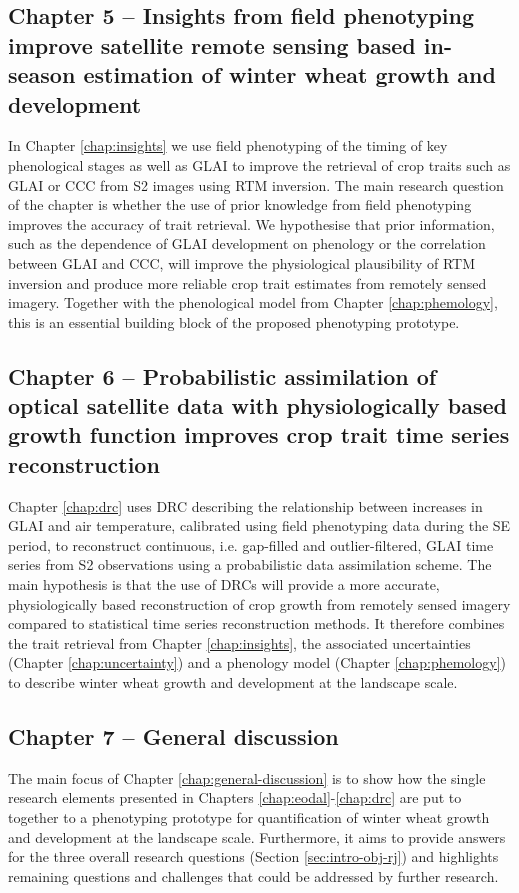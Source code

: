 \subsection*{Chapter 5 -- Insights from field phenotyping improve satellite remote sensing based in-season estimation of winter wheat growth and development}
In Chapter \ref{chap:insights} we use field phenotyping of the timing of key phenological stages as well as \gls{GLAI} to improve the retrieval of crop traits such as \gls{GLAI} or \gls{CCC} from \gls{S2} images using \gls{RTM} inversion. The main research question of the chapter is whether the use of prior knowledge from field phenotyping improves the accuracy of trait retrieval. We hypothesise that prior information, such as the dependence of \gls{GLAI} development on phenology or the correlation between \gls{GLAI} and \gls{CCC}, will improve the physiological plausibility of \gls{RTM} inversion and produce more reliable crop trait estimates from remotely sensed imagery. Together with the phenological model from Chapter \ref{chap:phemology}, this is an essential building block of the proposed phenotyping prototype.

\subsection*{Chapter 6 -- Probabilistic assimilation of optical satellite data with physiologically based growth function improves crop trait time series reconstruction}
Chapter \ref{chap:drc} uses \gls{DRC} describing the relationship between increases in \gls{GLAI} and air temperature, calibrated using field phenotyping data during the \gls{SE} period, to reconstruct continuous, i.e. gap-filled and outlier-filtered, \gls{GLAI} time series from \gls{S2} observations using a probabilistic data assimilation scheme. The main hypothesis is that the use of \gls{DRC}s will provide a more accurate, physiologically based reconstruction of crop growth from remotely sensed imagery compared to statistical time series reconstruction methods. It therefore combines the trait retrieval from Chapter \ref{chap:insights}, the associated uncertainties (Chapter \ref{chap:uncertainty}) and a phenology model (Chapter \ref{chap:phemology}) to describe winter wheat growth and development at the landscape scale.

\subsection*{Chapter 7 -- General discussion}
The main focus of Chapter \ref{chap:general-discussion} is to show how the single research elements presented in Chapters \ref{chap:eodal}-\ref{chap:drc} are put to together to a phenotyping prototype for quantification of winter wheat growth and development at the landscape scale. Furthermore, it aims to provide answers for the three overall research questions (Section \ref{sec:intro-obj-rj}) and highlights remaining questions and challenges that could be addressed by further research.